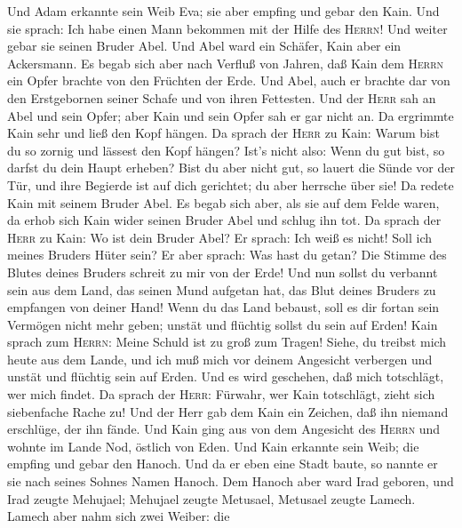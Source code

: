  Und Adam erkannte sein Weib Eva; sie aber empfing und
gebar den Kain. Und sie sprach: Ich habe einen Mann bekommen mit der
Hilfe des \textsc{Herrn}!  Und weiter gebar sie seinen
Bruder Abel. Und Abel ward ein Schäfer, Kain aber ein Ackersmann.
 Es begab sich aber nach Verfluß von Jahren, daß Kain dem
\textsc{Herrn} ein Opfer brachte von den Früchten der Erde.
 Und Abel, auch er brachte dar von den Erstgebornen seiner
Schafe und von ihren Fettesten.  Und der \textsc{Herr} sah
an Abel und sein Opfer; aber Kain und sein Opfer sah er gar nicht an. Da
ergrimmte Kain sehr und ließ den Kopf hängen.  Da sprach
der \textsc{Herr} zu Kain: Warum bist du so zornig und lässest den Kopf
hängen? Ist's nicht also: Wenn du gut bist, so darfst du dein Haupt
erheben?  Bist du aber nicht gut, so lauert die Sünde vor
der Tür, und ihre Begierde ist auf dich gerichtet; du aber herrsche über
sie!  Da redete Kain mit seinem Bruder Abel. Es begab sich
aber, als sie auf dem Felde waren, da erhob sich Kain wider seinen
Bruder Abel und schlug ihn tot.  Da sprach der
\textsc{Herr} zu Kain: Wo ist dein Bruder Abel? Er sprach: Ich weiß es
nicht! Soll ich meines Bruders Hüter sein?  Er aber
sprach: Was hast du getan? Die Stimme des Blutes deines Bruders schreit
zu mir von der Erde!  Und nun sollst du verbannt sein aus
dem Land, das seinen Mund aufgetan hat, das Blut deines Bruders zu
empfangen von deiner Hand!  Wenn du das Land bebaust,
soll es dir fortan sein Vermögen nicht mehr geben; unstät und flüchtig
sollst du sein auf Erden!  Kain sprach zum
\textsc{Herrn}: Meine Schuld ist zu groß zum Tragen! 
Siehe, du treibst mich heute aus dem Lande, und ich muß mich vor deinem
Angesicht verbergen und unstät und flüchtig sein auf Erden. Und es wird
geschehen, daß mich totschlägt, wer mich findet.  Da
sprach der \textsc{Herr}: Fürwahr, wer Kain totschlägt, zieht sich
siebenfache Rache zu! Und der Herr gab dem Kain ein Zeichen, daß ihn
niemand erschlüge, der ihn fände.  Und Kain ging aus von
dem Angesicht des \textsc{Herrn} und wohnte im Lande Nod, östlich von
Eden.  Und Kain erkannte sein Weib; die empfing und gebar
den Hanoch. Und da er eben eine Stadt baute, so nannte er sie nach
seines Sohnes Namen Hanoch.  Dem Hanoch aber ward Irad
geboren, und Irad zeugte Mehujael; Mehujael zeugte Metusael, Metusael
zeugte Lamech.  Lamech aber nahm sich zwei Weiber: die

